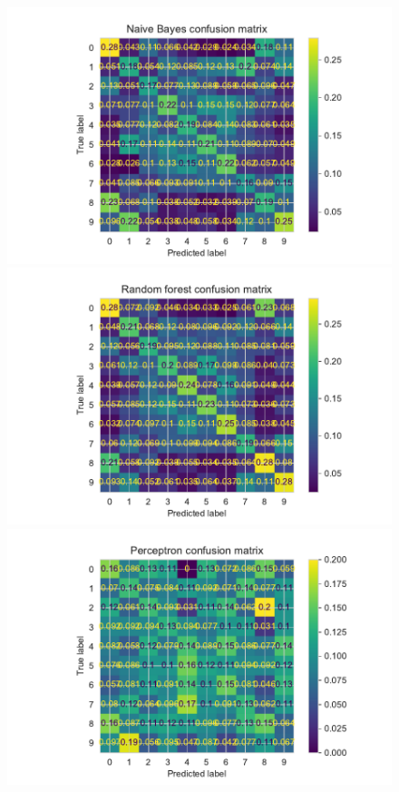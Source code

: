 \documentclass[11pt]{article}
\begin{document}
\begin{figure}[H]
\begin{minipage}[c]{0.5\textwidth}
\includegraphics[width=1\linewidth]{figures/Cifar/CM__NB_color_hist.pdf}
\end{minipage}
\begin{minipage}[c]{0.5\textwidth}
\includegraphics[width=1\linewidth]{figures/Cifar/CM__Rndf_color_hist.pdf}
\end{minipage}
\begin{minipage}[c]{0.5\textwidth}
\includegraphics[width=1\linewidth]{figures/Cifar/CM__ppn_color_hist.pdf}

\end{minipage}
\end{figure}
\end{document}
